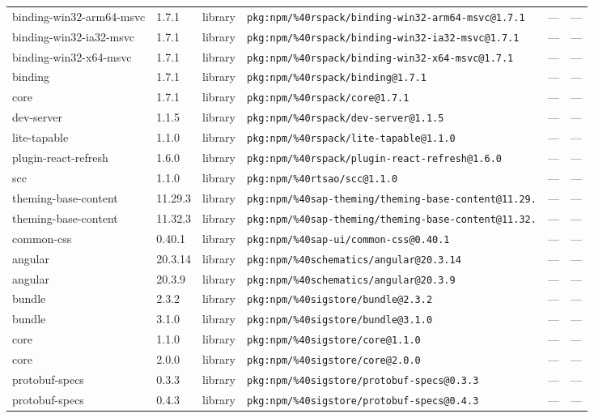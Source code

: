 \documentclass[11pt]{article}
\begin{document}
\begin{longtable}{|l|l|l|p{2.2cm}|l|p{4cm}|}
binding-win32-arm64-msvc & 1.7.1 & library & \texttt{pkg:npm/\%40rspack/binding-win32-arm64-msvc@1.7.1} & — & — \\
binding-win32-ia32-msvc & 1.7.1 & library & \texttt{pkg:npm/\%40rspack/binding-win32-ia32-msvc@1.7.1} & — & — \\
binding-win32-x64-msvc & 1.7.1 & library & \texttt{pkg:npm/\%40rspack/binding-win32-x64-msvc@1.7.1} & — & — \\
binding & 1.7.1 & library & \texttt{pkg:npm/\%40rspack/binding@1.7.1} & — & — \\
core & 1.7.1 & library & \texttt{pkg:npm/\%40rspack/core@1.7.1} & — & — \\
dev-server & 1.1.5 & library & \texttt{pkg:npm/\%40rspack/dev-server@1.1.5} & — & — \\
lite-tapable & 1.1.0 & library & \texttt{pkg:npm/\%40rspack/lite-tapable@1.1.0} & — & — \\
plugin-react-refresh & 1.6.0 & library & \texttt{pkg:npm/\%40rspack/plugin-react-refresh@1.6.0} & — & — \\
scc & 1.1.0 & library & \texttt{pkg:npm/\%40rtsao/scc@1.1.0} & — & — \\
theming-base-content & 11.29.3 & library & \texttt{pkg:npm/\%40sap-theming/theming-base-content@11.29.} & — & — \\
theming-base-content & 11.32.3 & library & \texttt{pkg:npm/\%40sap-theming/theming-base-content@11.32.} & — & — \\
common-css & 0.40.1 & library & \texttt{pkg:npm/\%40sap-ui/common-css@0.40.1} & — & — \\
angular & 20.3.14 & library & \texttt{pkg:npm/\%40schematics/angular@20.3.14} & — & — \\
angular & 20.3.9 & library & \texttt{pkg:npm/\%40schematics/angular@20.3.9} & — & — \\
bundle & 2.3.2 & library & \texttt{pkg:npm/\%40sigstore/bundle@2.3.2} & — & — \\
bundle & 3.1.0 & library & \texttt{pkg:npm/\%40sigstore/bundle@3.1.0} & — & — \\
core & 1.1.0 & library & \texttt{pkg:npm/\%40sigstore/core@1.1.0} & — & — \\
core & 2.0.0 & library & \texttt{pkg:npm/\%40sigstore/core@2.0.0} & — & — \\
protobuf-specs & 0.3.3 & library & \texttt{pkg:npm/\%40sigstore/protobuf-specs@0.3.3} & — & — \\
protobuf-specs & 0.4.3 & library & \texttt{pkg:npm/\%40sigstore/protobuf-specs@0.4.3} & — & — \\

\end{longtable}
\end{document}
